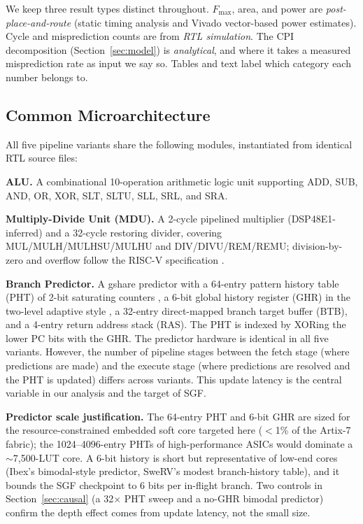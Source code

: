 \documentclass[acmsmall,nonacm,screen]{acmart}
\begin{document}
We keep three result types distinct throughout. $F_{\max}$, area, and power are \emph{post-place-and-route} (static timing analysis and Vivado vector-based power estimates). Cycle and misprediction counts are from \emph{RTL simulation}. The CPI decomposition (Section~\ref{sec:model}) is \emph{analytical}, and where it takes a measured misprediction rate as input we say so. Tables and text label which category each number belongs to.

\subsection{Common Microarchitecture}
\label{sec:common}

All five pipeline variants share the following modules, instantiated from identical RTL source files:

\textbf{ALU.} A combinational 10-operation arithmetic logic unit supporting ADD, SUB, AND, OR, XOR, SLT, SLTU, SLL, SRL, and SRA.

\textbf{Multiply-Divide Unit (MDU).} A 2-cycle pipelined multiplier (DSP48E1-inferred) and a 32-cycle restoring divider, covering MUL/MULH/MULHSU/MULHU and DIV/DIVU/REM/REMU; division-by-zero and overflow follow the RISC-V specification \cite{waterman2019riscv}.

\textbf{Branch Predictor.} A gshare predictor \cite{mcfarling1993combining} with a 64-entry pattern history table (PHT) of 2-bit saturating counters \cite{smith1981study}, a 6-bit global history register (GHR) in the two-level adaptive style \cite{yeh1991two}, a 32-entry direct-mapped branch target buffer (BTB), and a 4-entry return address stack (RAS). The PHT is indexed by XORing the lower PC bits with the GHR. The predictor hardware is identical in all five variants. However, the number of pipeline stages between the fetch stage (where predictions are made) and the execute stage (where predictions are resolved and the PHT is updated) differs across variants. This update latency is the central variable in our analysis and the target of SGF.

\textbf{Predictor scale justification.} The 64-entry PHT and 6-bit GHR are sized for the resource-constrained embedded soft core targeted here ($<$1\% of the Artix-7 fabric); the 1024--4096-entry PHTs of high-performance ASICs would dominate a $\sim$7{,}500-LUT core.
A 6-bit history is short but representative of low-end cores (Ibex's bimodal-style predictor, SweRV's modest branch-history table), and it bounds the SGF checkpoint to 6 bits per in-flight branch.
Two controls in Section~\ref{sec:causal} (a 32$\times$ PHT sweep and a no-GHR bimodal predictor) confirm the depth effect comes from update latency, not the small size.
\end{document}
